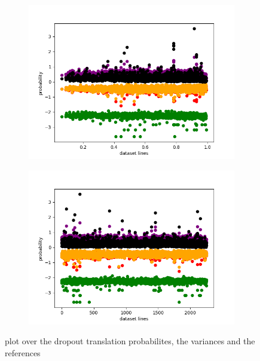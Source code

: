 \begin{figure}[ht]
    \centering
    \begin{subfigure}{0.4\linewidth}
    \includegraphics[width=\textwidth]{Latex/sections/images/seamlessscoresoverref.png}
    \end{subfigure}
    \begin{subfigure}{0.4\linewidth}
    \includegraphics[width=\linewidth]{Latex/sections/images/seamlessscores.png}
    \end{subfigure}
    
    \caption{plot over the dropout translation probabilites, the variances and the references}
    \label{fig:dropout scatter plot}
\end{figure}

